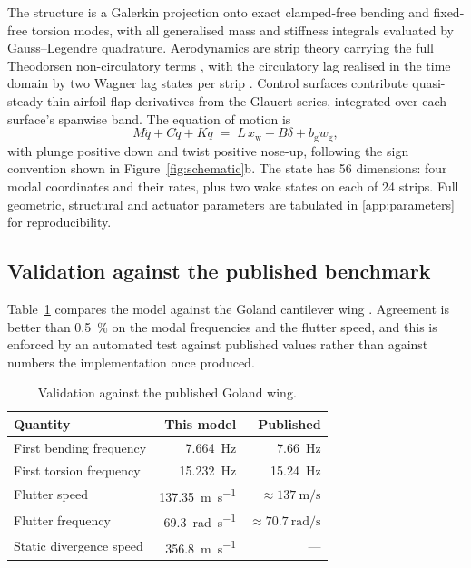 \documentclass[preprint,11pt,authoryear]{elsarticle}
\begin{document}
The structure is a Galerkin projection onto exact clamped-free bending and
fixed-free torsion modes, with all generalised mass and stiffness integrals
evaluated by Gauss--Legendre quadrature. Aerodynamics are strip theory carrying
the full Theodorsen non-circulatory terms \citep{theodorsen1935}, with the
circulatory lag realised in the time domain by two Wagner lag states per strip
\citep{jones1940}. Control surfaces contribute quasi-steady thin-airfoil flap
derivatives from the Glauert series, integrated over each surface's spanwise
band. The equation of motion is
\begin{equation}
M \ddot q + C \dot q + K q \;=\; L\, x_{\mathrm{w}} + B \delta
+ b_{\mathrm{g}} w_{\mathrm{g}} ,
\label{eq:eom}
\end{equation}
with plunge positive down and twist positive nose-up, following the sign
convention shown in Figure~\ref{fig:schematic}b. The state has 56 dimensions:
four modal coordinates and their rates, plus two wake states on each of 24
strips. Full geometric, structural and actuator parameters are tabulated in
\ref{app:parameters} for reproducibility.

\subsection{Validation against the published benchmark}

Table~\ref{tab:validation} compares the model against the Goland cantilever wing
\citep{goland1945}. Agreement is better than \SI{0.5}{\percent} on the modal
frequencies and the flutter speed, and this is enforced by an automated test
against published values rather than against numbers the implementation once
produced.

\begin{table}[t]
\centering
\caption{Validation against the published Goland wing.}
\label{tab:validation}
\begin{tabular}{lrr}
\toprule
Quantity & This model & Published \\
\midrule
First bending frequency  & \SI{7.664}{\hertz}  & \SI{7.66}{\hertz} \\
First torsion frequency  & \SI{15.232}{\hertz} & \SI{15.24}{\hertz} \\
Flutter speed            & \SI{137.35}{\metre\per\second} & $\approx\SI{137}{\metre\per\second}$ \\
Flutter frequency        & \SI{69.3}{\radian\per\second}  & $\approx\SI{70.7}{\radian\per\second}$ \\
Static divergence speed  & \SI{356.8}{\metre\per\second} & --- \\
\bottomrule
\end{tabular}
\end{table}
\end{document}
